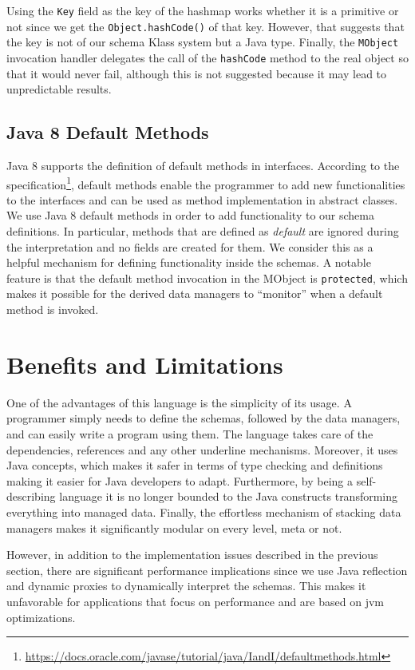 Using the \texttt{Key} field as the key of the hashmap works whether it is a primitive or not since we get the \texttt{Object.hashCode()} of that key.
However, that suggests that the key is not of our schema Klass system but a Java type.
Finally, the \texttt{MObject} invocation handler delegates the call of the \texttt{hashCode} method to the real object so that it would never fail, although this is not suggested because it may lead to unpredictable results.

\subsection{Java 8 Default Methods}\label{Java 8 Default Methods}
Java 8 supports the definition of default methods in interfaces.
According to the specification\footnote{\url{https://docs.oracle.com/javase/tutorial/java/IandI/defaultmethods.html}}, default methods enable the programmer to add new functionalities to the interfaces and can be used as method implementation in abstract classes.
We use Java 8 default methods in order to add functionality to our schema definitions. 
In particular, methods that are defined as \textit{default} are ignored during the interpretation and no fields are created for them.
We consider this as a helpful mechanism for defining functionality inside the schemas.
A notable feature is that the default method invocation in the MObject is \texttt{protected}, which makes it possible for the derived data managers to ``monitor'' when a default method is invoked.

\section{Benefits and Limitations}\label{Benefits and Limitations}
One of the advantages of this language is the simplicity of its usage. 
A programmer simply needs to define the schemas, followed by the data managers, and can easily write a program using them.
The language takes care of the dependencies, references and any other underline mechanisms.
Moreover, it uses Java concepts, which makes it safer in terms of type checking and definitions making it easier for Java developers to adapt.
Furthermore, by being a self-describing language it is no longer bounded to the Java constructs transforming everything into managed data.
Finally, the effortless mechanism of stacking data managers makes it significantly modular on every level, meta or not.

However, in addition to the implementation issues described in the previous section, there are significant performance implications since we use Java reflection and dynamic proxies to dynamically interpret the schemas. 
This makes it unfavorable for applications that focus on performance and are based on \ac{jvm} optimizations.


